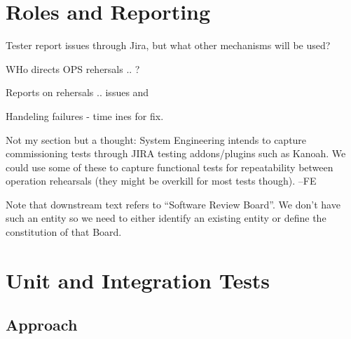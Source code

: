 




\section{Roles and Reporting}

Tester report issues through Jira, but what other mechanisms will be used?

WHo directs OPS rehersals .. ?

Reports on rehersals .. issues and

Handeling failures - time ines for fix.


\begin{note}
  Not my section but a thought: System Engineering intends to capture commissioning tests through JIRA testing addons/plugins such as Kanoah. We could use some of these to capture functional tests for repeatability between operation rehearsals (they might be overkill for most tests though). --FE
\end{note}

\begin{note}
  Note that downstream text refers to ``Software Review Board''. We don't have such an entity so we need to either identify an existing entity or define the constitution of that Board.
\end{note}















\section{Unit and Integration Tests}

\subsection{Approach}

